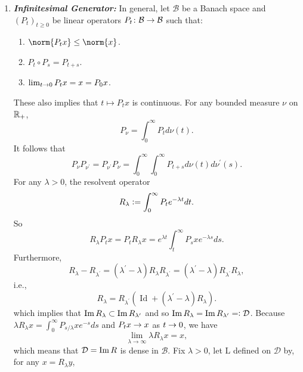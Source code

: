 \begin{enumerate}[label=\arabic{*}.]
	\item \textbf{\emph{Infinitesimal Generator:}} In general, let $\mathcal{B}$ be a Banach space and $(P_t)_{t \geq 0}$ be linear operators $P_t \colon \mathcal{B} \rightarrow \mathcal{B}$ such that:
	\begin{enumerate}[label=(\roman*)]
		\item $\norm{P_tx} \leq \norm{x}$.
		\item $P_t \circ P_s = P_{t+s}$.
		\item $\lim_{t \rightarrow 0} P_tx = x = P_0x$.
	\end{enumerate}
	These also implies that $t \mapsto P_tx$ is continuous. For any bounded measure $\nu$ on $\mathbb{R}_+$,
	\begin{equation*}
		P_\nu = \int_0^\infty P_t d\nu(t).
	\end{equation*}
	It follows that
	\begin{equation*}
		P_\nu P_{\nu^{\prime}}=P_{\nu^{\prime}} P_\nu=\int_0^{\infty} \int_0^{\infty} P_{t+s} d \nu(t) d \nu^{\prime}(s).
	\end{equation*}
	For any $\lambda > 0$, the resolvent operator
	\begin{equation*}
		R_\lambda \vcentcolon= \int_0^\infty P_t e^{-\lambda t}dt.
	\end{equation*}
	So
	\begin{equation*}
		R_\lambda P_tx = P_t R_\lambda x = e^{\lambda t} \int_t^{\infty} P_s x e^{-\lambda s} d s.
	\end{equation*}
	Furthermore,
	\begin{equation*}
		R_\lambda-R_{\lambda^{\prime}}=\left(\lambda^{\prime}-\lambda\right) R_\lambda R_{\lambda^{\prime}}=\left(\lambda^{\prime}-\lambda\right) R_{\lambda^{\prime}} R_\lambda,
	\end{equation*}
	i.e.,
	\begin{equation*}
		R_\lambda=R_{\lambda^{\prime}}\left(\operatorname{Id}+\left(\lambda^{\prime}-\lambda\right) R_\lambda\right).
	\end{equation*}
	which implies that $\operatorname{Im} R_\lambda \subset \operatorname{Im} R_{\lambda^\prime}$ and so $\operatorname{Im} R_\lambda = \operatorname{Im} R_{\lambda^\prime} =\vcentcolon \mathcal{D}$. Because $\lambda R_\lambda x=\int_0^{\infty} P_{s / \lambda} x e^{-s} d s$ and $P_tx \rightarrow x$ as $t \rightarrow 0$, we have
	\begin{equation*}
		\lim _{\lambda \rightarrow \infty} \lambda R_\lambda x=x ,
	\end{equation*}
	which means that $\mathcal{D} = \operatorname{Im} R$ is dense in $\mathcal{B}$. Fix $\lambda > 0$, let $\mathrm{L}$ defined on $\mathcal{D}$ by, for any $x = R_{\lambda}y$,

\end{enumerate}
